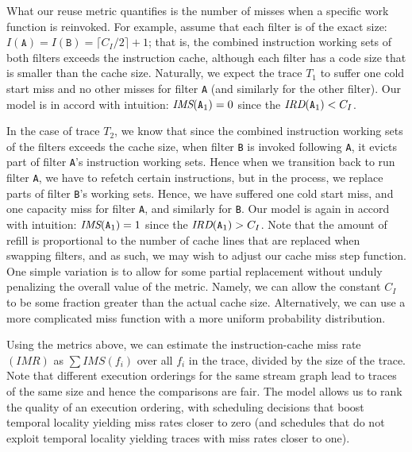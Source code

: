 What our reuse metric quantifies is the number of misses when a specific work
function is reinvoked. For example, assume that each filter is of the exact
size: $I(\texttt{A}) = I(\texttt{B}) = \lceil{C_I / 2}\rceil + 1$;
that is, the combined instruction working sets of both filters exceeds
the instruction cache, although each filter has a code size that is
smaller than the cache size. Naturally, we expect the trace $T_1$ to
suffer one cold start miss and no other misses for filter \texttt{A}
(and similarly for the other filter). Our model is in accord with
intuition:  $\mbox{\it IMS}(\texttt{A}_1) = 0$ since
the $\mbox{\it IRD}(\texttt{A}_1) < C_I$.

In the case of trace $T_2$, we know that since the combined
instruction working sets of the filters exceeds the cache size, when
filter \texttt{B} is invoked following \texttt{A}, it evicts part of
filter \texttt{A}'s instruction working sets. Hence when we transition
back to run filter \texttt{A}, we have to refetch certain
instructions, but in the process, we replace parts of filter
\texttt{B}'s working sets. Hence, we have suffered one cold start miss,
and one capacity miss for filter \texttt{A}, and similarly for
\texttt{B}. Our model is again in accord with intuition: 
$\mbox{\it IMS}(\texttt{A}_1) = 1$ since
the $\mbox{\it IRD}(\texttt{A}_1) > C_I$. Note that the
amount of refill is proportional to the number of cache lines that are
replaced when swapping filters, and as such, we may wish to adjust
our cache miss step function. One simple variation is to allow for
some partial replacement without unduly penalizing the overall value
of the metric. Namely, we can allow the constant $C_I$ to be some
fraction greater than the actual cache size. Alternatively, we can use
a more complicated miss function with a more uniform probability
distribution.

Using the metrics above, we can estimate the instruction-cache miss
rate $(IMR)$ as $\sum IMS(f_i)$ over all $f_i$ in the trace, divided
by the size of the trace. Note that different execution orderings for
the same stream graph lead to traces of the same size and hence the
comparisons are fair. The model allows us to rank the quality of an
execution ordering, with scheduling decisions that boost temporal
locality yielding miss rates closer to zero (and schedules that do not
exploit temporal locality yielding traces with miss rates closer to
one).

